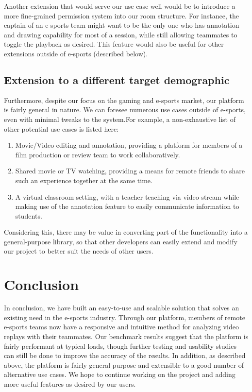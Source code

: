 \documentclass[conference]{IEEEtran}
\begin{document}
    Another extension that would serve our use case well would be to introduce a more fine-grained permission system into our room structure. For instance, the captain of an e-sports team might want to be the only one who has annotation and drawing capability for most of a session, while still allowing teammates to toggle the playback as desired. This feature would also be useful for other extensions outside of e-sports (described below).

\subsection{Extension to a different target demographic}

  Furthermore, despite our focus on the gaming and e-sports market, our platform is fairly general in nature. We can foresee numerous use cases outside of e-sports, even with minimal tweaks to the system.For example, a non-exhaustive list of other potential use cases is listed here:

  \begin{enumerate}
      \item Movie/Video editing and annotation, providing a platform for members of a film production or review team to work collaboratively.

      \item Shared movie or TV watching, providing a means for remote friends to share such an experience together at the same time.

      \item A virtual classroom setting, with a teacher teaching via video stream while making use of the annotation feature to easily communicate information to students.
  \end{enumerate}

   Considering this, there may be value in converting part of the functionality into a general-purpose library, so that other developers can easily extend and modify our project to better suit the needs of other users.

\section{Conclusion}

  In conclusion, we have built an easy-to-use and scalable solution that solves an existing need in the e-sports industry. Through our platform, members of remote e-sports teams now have a responsive and intuitive method for analyzing video replays with their teammates. Our benchmark results suggest that the platform is fairly performant at typical loads, though further testing and usability studies can still be done to improve the accuracy of the results. In addition, as described above, the platform is fairly general-purpose and extensible to a good number of alternative use cases. We hope to continue working on the project and adding more useful features as desired by our users.
\end{document}
